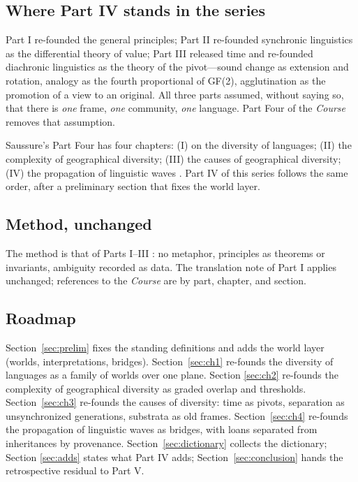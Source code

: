 \documentclass[11pt,a4paper]{article}
\theoremstyle{remark}
\begin{document}
\subsection{Where Part IV stands in the series}

Part I \cite{part1} re-founded the general principles; Part II \cite{part2}
re-founded synchronic linguistics as the differential theory of value; Part
III \cite{part3} released time and re-founded diachronic linguistics as the
theory of the pivot---sound change as extension and rotation, analogy as the
fourth proportional of GF(2), agglutination as the promotion of a view to an
original. All three parts assumed, without saying so, that there is \emph{one}
frame, \emph{one} community, \emph{one} language. Part Four of the
\textit{Course} removes that assumption.

Saussure's Part Four has four chapters: (I) on the diversity of languages;
(II) the complexity of geographical diversity; (III) the causes of
geographical diversity; (IV) the propagation of linguistic waves
\cite[Part IV]{harris1983}. Part IV of this series follows the same order,
after a preliminary section that fixes the world layer.

\subsection{Method, unchanged}

The method is that of Parts I--III \cite{part1,part2,part3}: no metaphor,
principles as theorems or invariants, ambiguity recorded as data. The
translation note of Part I applies unchanged; references to the
\textit{Course} are by part, chapter, and section.

\subsection{Roadmap}

Section~\ref{sec:prelim} fixes the standing definitions and adds the world
layer (worlds, interpretations, bridges). Section~\ref{sec:ch1} re-founds the
diversity of languages as a family of worlds over one plane. Section
\ref{sec:ch2} re-founds the complexity of geographical diversity as graded
overlap and thresholds. Section~\ref{sec:ch3} re-founds the causes of
diversity: time as pivots, separation as unsynchronized generations,
substrata as old frames. Section~\ref{sec:ch4} re-founds the propagation of
linguistic waves as bridges, with loans separated from inheritances by
provenance. Section~\ref{sec:dictionary} collects the dictionary; Section
\ref{sec:adds} states what Part IV adds; Section~\ref{sec:conclusion} hands
the retrospective residual to Part V.
\end{document}
